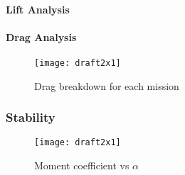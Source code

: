 \paragraph{Lift Analysis}


\paragraph{Drag Analysis}

\begin{figure}[h!]
	\centering
	\texttt{[image: draft2x1]}
	\caption{Drag breakdown for each mission}
	\label{fig:dragbreakdown}
\end{figure}


\subsubsection{Stability}
\label{sssec:stability}

\begin{figure}[h!]
	\centering
	\texttt{[image: draft2x1]}
	\caption{Moment coefficient vs \(\alpha\)}
	\label{fig:cmva}
\end{figure}

